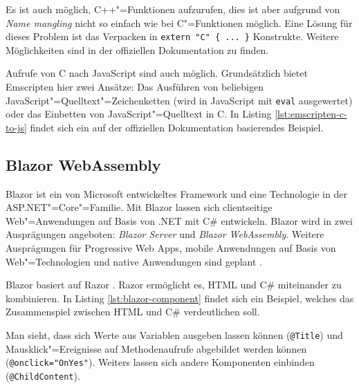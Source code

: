 

Es ist auch möglich, C++"=Funktionen aufzurufen, dies ist aber aufgrund von \emph{Name mangling} nicht so einfach wie bei C"=Funktionen möglich. Eine Lösung für dieses Problem ist das Verpacken in \lstinline|extern "C" { ... }| Konstrukte. Weitere Möglichkeiten sind in der offiziellen Dokumentation zu finden.

Aufrufe von C nach JavaScript sind auch möglich. Grundsätzlich bietet Emscripten hier zwei Ansätze: Das Ausführen von beliebigen JavaScript"=Quelltext"=Zeichenketten (wird in JavaScript mit \lstinline{eval} ausgewertet) oder das Einbetten von JavaScript"=Quelltext in C. In Listing \ref{lst:emscripten-c-to-js} findet sich ein auf der offiziellen Dokumentation basierendes Beispiel.



\subsection{Blazor WebAssembly}
Blazor \cite{Blazor} ist ein von Microsoft entwickeltes Framework und eine Technologie in der ASP.NET"=Core"=Familie. Mit Blazor lassen sich clientseitige Web"=Anwendungen auf Basis von .NET mit C\#{} entwickeln. Blazor wird in zwei Ausprägungen angeboten: \emph{Blazor Server} und \emph{Blazor WebAssembly}. Weitere Ausprägungen für Progressive Web Apps, mobile Anwendungen auf Basis von Web"=Technologien und native Anwendungen sind geplant \cite{BlazorBlog}.

Blazor basiert auf Razor \cite{Razor}. Razor ermöglicht es, HTML und C\#{} miteinander zu kombinieren. In Listing \ref{lst:blazor-component} findet sich ein Beispiel, welches das Zusammenspiel zwischen HTML und C\#{} verdeutlichen soll.

\pagebreak


Man sieht, dass sich Werte aus Variablen ausgeben lassen können (\lstinline{@Title}) und Mausklick"=Ereignisse auf Methodenaufrufe abgebildet werden können (\lstinline{@onclick="OnYes"}). Weiters lassen sich andere Komponenten einbinden (\lstinline{@ChildContent}).

